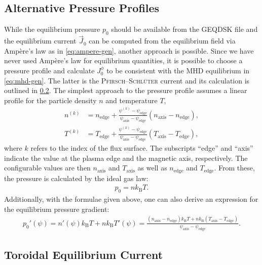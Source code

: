 \subsection{Alternative Pressure Profiles}
\label{sec:pres0}

While the equilibrium pressure $p_{0}$ should be available from the GEQDSK file and the equilibrium current $\vec{J}_{0}$ can be computed from the equilibrium field via Ampère's law as in \cref{eq:ampere-gen}, another approach is possible. Since we have never used Ampère's law for equilibrium quantities, it is possible to choose a pressure profile and calculate $J_0^{\phi}$ to be consistent with the MHD equilibrium in \cref{eq:mhd-gen}. The latter is the \textsc{Pfirsch}--\textsc{Schlüter} current and its calculation is outlined in \cref{sec:j0phi}. The simplest approach to the pressure profile assumes a linear profile for the particle density $n$ and temperature $T$,
\begin{align}
  n^{(k)} &= n_{\text{edge}} + \frac{\psi^{(k)} - \psi_{\text{edge}}}{\psi_{\text{axis}} - \psi_{\text{edge}}} (n_{\text{axis}} - n_{\text{edge}}), \label{eq:dens} \\
  T^{(k)} &= T_{\text{edge}} + \frac{\psi^{(k)} - \psi_{\text{edge}}}{\psi_{\text{axis}} - \psi_{\text{edge}}} (T_{\text{axis}} - T_{\text{edge}}), \label{eq:temp}
\end{align}
where $k$ refers to the index of the flux surface. The subscripts \enquote{edge} and \enquote{axis} indicate the value at the plasma edge and the magnetic axis, respectively. The configurable values are then $n_{\text{axis}}$ and $T_{\text{axis}}$ as well as $n_{\text{edge}}$ and $T_{\text{edge}}$. From these, the pressure is calculated by the ideal gas law:
\begin{gather}
  p_{0} = n k_{\text{B}} T. \label{eq:pres0}
\end{gather}
Additionally, with the formulae given above, one can also derive an expression for the equilibrium pressure gradient:
\begin{gather}
  p_{0}' (\psi) = n' (\psi) k_{\text{B}} T + n k_{\text{B}} T' (\psi) = \frac{(n_{\text{axis}} - n_{\text{edge}}) k_{\text{B}} T + n k_{\text{B}} (T_{\text{axis}} - T_{\text{edge}})}{\psi_{\text{axis}} - \psi_{\text{edge}}}.
\end{gather}

\subsection{Toroidal Equilibrium Current}
\label{sec:j0phi}


